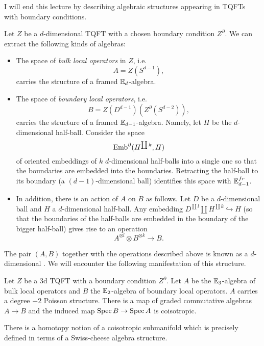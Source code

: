 I will end this lecture by describing algebraic structures appearing in TQFTs with boundary conditions.

Let $Z$ be a $d$-dimensional TQFT with a chosen boundary condition $Z^\partial$. We can extract the following kinds of algebras:
\begin{itemize}
\item The space of \emph{bulk local operators} in $Z$, i.e.
\[A = Z(S^{d-1}),\]
carries the structure of a framed $\mathbb{E}_d$-algebra.

\item The space of \emph{boundary local operators}, i.e.
\[B = Z(D^{d-1})(Z^\partial(S^{d-2})),\]
carries the structure of a framed $\mathbb{E}_{d-1}$-algebra. Namely, let $H$ be the $d$-dimensional half-ball. Consider the space
\[\mathrm{Emb}^\partial(H^{\coprod k}, H)\]
of oriented embeddings of $k$ $d$-dimensional half-balls into a single one so that the boundaries are embedded into the boundaries. Retracting the half-ball to its boundary (a $(d-1)$-dimensional ball) identifies this space with $\mathbb{E}^{fr}_{d-1}$.

\item In addition, there is an action of $A$ on $B$ as follows. Let $D$ be a $d$-dimensional ball and $H$ a $d$-dimensional half-ball. Any embedding $D^{\coprod l}\coprod H^{\coprod k}\hookrightarrow H$ (so that the boundaries of the half-balls are embedded in the boundary of the bigger half-ball) gives rise to an operation
\[A^{\otimes l}\otimes B^{\otimes k}\longrightarrow B.\]
\end{itemize}

The pair $(A, B)$ together with the operations described above is known as a $d$-dimensional . We will encounter the following manifestation of this structure.

\begin{example}
Let $Z$ be a 3d TQFT with a boundary condition $Z^\partial$. Let $A$ be the $\mathbb{E}_3$-algebra of bulk local operators and $B$ the $\mathbb{E}_2$-algebra of boundary local operators. $A$ carries a degree $-2$ Poisson structure. There is a map of graded commutative algebras $A\rightarrow B$ and the induced map $\operatorname{Spec} B\rightarrow \operatorname{Spec} A$ is coisotropic.
\end{example}

\begin{remark}
There is a homotopy notion of a coisotropic submanifold which is precisely defined in terms of a Swiss-cheese algebra structure.
\end{remark}


